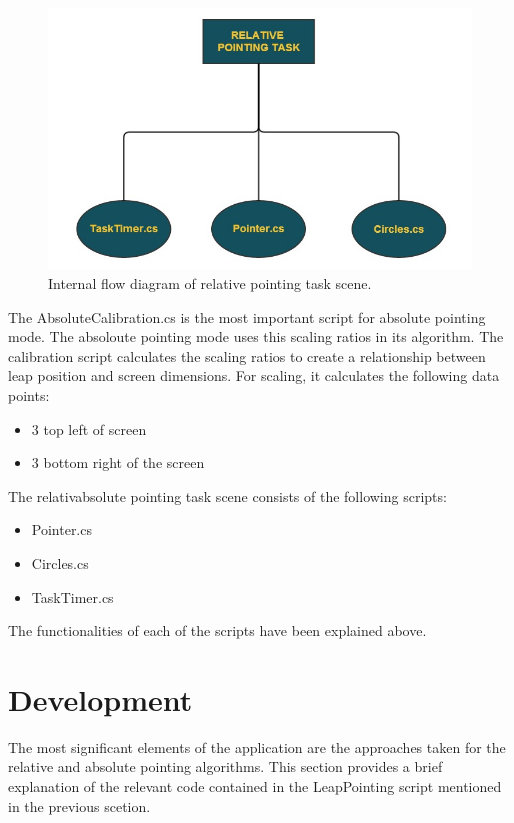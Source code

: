 \documentclass[titlepage]{article}
\begin{document}
\begin{figure}[!h]
    \centering
    \includegraphics[width=4.5in]{Figure_9}
    \caption{Internal flow diagram of relative pointing task scene.}
\end{figure}
 

The AbsoluteCalibration.cs is the most important script for absolute pointing mode. The absoloute pointing mode uses this scaling ratios in its algorithm. The calibration script calculates the scaling ratios to create a relationship between leap position and screen dimensions. For scaling, it calculates the following data points:

\begin{itemize}
    \item 3 top left of screen
    \item 3 bottom right of the screen

\end{itemize}


The relativabsolute pointing task scene consists of the following scripts:

\begin{itemize}
    \item Pointer.cs
    \item Circles.cs
    \item TaskTimer.cs
    
\end{itemize}

The functionalities of each of the scripts have been explained above.

\section{Development}

The most significant elements of the application are the approaches taken for the relative and absolute pointing algorithms. This section provides a brief explanation of the relevant code contained in the LeapPointing script mentioned in the previous scetion.
\end{document}
